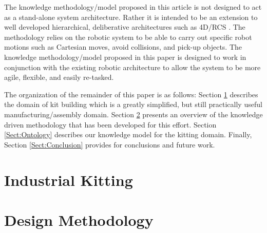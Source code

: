 \documentclass[preprint,12pt]{elsarticle}
\begin{document}
The knowledge methodology/model proposed in this article is not designed to act as a stand-alone
system architecture. Rather it is intended to be an extension to well developed hierarchical, 
deliberative architectures such as 4D/RCS \cite{Albus2000}. The methodology relies on the robotic system
to be able to carry out
specific robot motions such as Cartesian moves, avoid collisions, and pick-up objects. 
The knowledge methodology/model proposed in this paper is designed to work in conjunction with the existing
robotic architecture to allow the system to be more agile, flexible, and easily re-tasked.


The organization of the remainder of this paper is as follows: Section \ref{Sect:Kitting} describes the domain of kit building
which is a greatly simplified, but still practically useful manufacturing/assembly domain.
Section \ref{Sect:Methodology} presents an overview of the knowledge driven methodology that
has been developed for this effort.  Section \ref{Sect:Ontology} describes our knowledge model for the kitting
domain. Finally, Section \ref{Sect:Conclusion} provides for conclusions and
future work.

\section{Industrial Kitting}
\label{Sect:Kitting}


\section{Design Methodology}
\label{Sect:Methodology}

\end{document}
